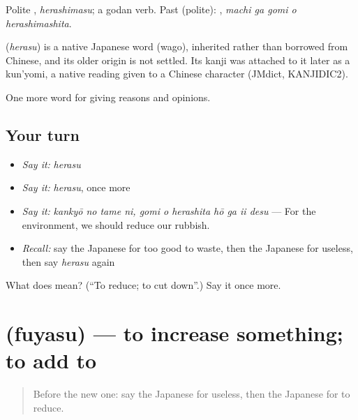 Polite \textbf{}, \emph{herashimasu}; a godan verb. Past (polite): \textbf{  }, \emph{machi ga gomi o herashimashita}.

\begin{cousinweb}
\textbf{} (\emph{herasu}) is a native Japanese word (wago), inherited rather than borrowed from Chinese, and its older origin is not settled. Its kanji was attached to it later as a kun'yomi, a native reading given to a Chinese character (JMdict, KANJIDIC2).
\end{cousinweb}

\begin{grammarlens}[title={What you've built}]
One more word for giving reasons and opinions.
\end{grammarlens}

\subsection*{Your turn}
\begin{itemize}
\raggedright
  \item \emph{Say it:} \emph{herasu}
  \item \emph{Say it:} \emph{herasu}, once more
  \item \emph{Say it:} \emph{kankyō no tame ni, gomi o herashita hō ga ii desu} — For the environment, we should reduce our rubbish.
  \item \emph{Recall:} say the Japanese for too good to waste, then the Japanese for useless, then say \emph{herasu} again
\end{itemize}

\begin{tcolorbox}[breakable,colback=teal!4,colframe=teal!35!black,title={Before you move on}]
What does  mean? (\textquotedblleft{}To reduce; to cut down\textquotedblright{}.) Say it once more.
\end{tcolorbox}
\section[\texorpdfstring{\ja{ふやす} (fuyasu)}{ふやす (fuyasu)}]{ (fuyasu) — to increase something; to add to}

\label{lesson:JA-C338-fuyasu}



\begin{quote}
Before the new one: say the Japanese for useless, then the Japanese for to reduce.
\end{quote}

